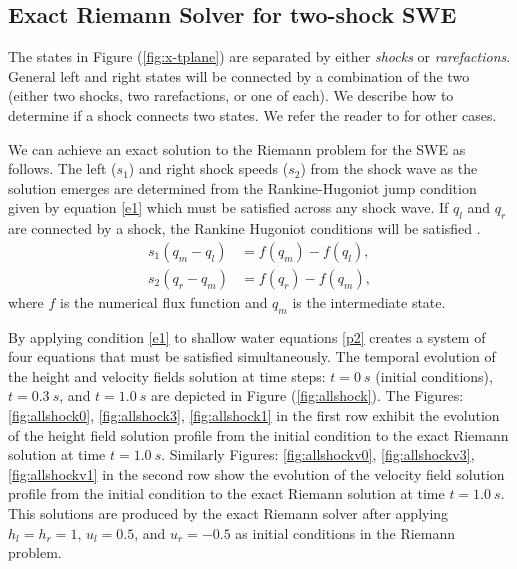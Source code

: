 \documentclass[10pt,a4paper]{article}
\newcommand{\Fig}[1]{Figure (\ref{fig:#1})}
\begin{document}
	
	
	\subsection{Exact Riemann Solver for two-shock SWE}
	The states in \Fig{x-tplane} are separated by either {\em shocks} or {\em rarefactions}. General left and right states will be connected by a combination of the two (either two shocks, two rarefactions, or one of each).  We describe how to determine if a shock connects two states.  We refer the reader to   \citet{leveque2002finite} for other cases. 
	
	We can achieve an exact solution to the Riemann problem for the SWE as follows. 
	The left ($s_1$) and right shock speeds ($s_2$)  from the shock wave as the solution emerges are determined from the Rankine-Hugoniot jump condition given by equation \eqref{e1}  which must be satisfied across any shock wave.  If $q_l$ and $q_r$ are connected by a shock, the Rankine Hugoniot conditions will be satisfied \citep{leveque2002finite,toro2001shock}.
	\begin{equation}
		\begin{aligned}
			s_1(q_{m} - q_{l}) & = f(q_{m}) - f(q_{l}), \\
			s_2(q_{r} - q_{m}) & = f(q_{r}) - f(q_{m}),
		\end{aligned}
		\label{e1}
	\end{equation}
	where $f$ is the numerical flux function and $q_m$ is the intermediate state. 
	
	By applying condition  \eqref{e1} to shallow water equations \eqref{p2}  creates a system of four equations that must be satisfied simultaneously. The temporal evolution of the height and velocity fields solution at time steps: $t=0~s$ (initial conditions), $t = 0.3~s$, and $t = 1.0~s$ are  depicted in \Fig{allshock}. The Figures: \ref{fig:allshock0}, \ref{fig:allshock3}, \ref{fig:allshock1} in the first row exhibit the evolution of the height field solution profile from the initial condition to the exact Riemann solution at time $t = 1.0~s$. Similarly Figures: \ref{fig:allshockv0}, \ref{fig:allshockv3}, \ref{fig:allshockv1} in the second row show the evolution of the velocity field solution profile from the initial condition to the exact Riemann solution at time $t = 1.0~s$. This solutions are produced by the exact Riemann solver after applying $h_l = h_r = 1$, $u_l  =  0.5$, and $u_r = -0.5$ as initial conditions in  the Riemann problem.
	
\end{document}
